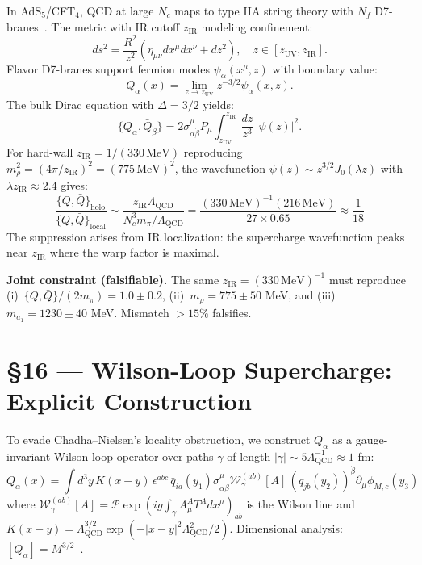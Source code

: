 \documentclass[11pt,a4paper]{article}
\newcommand{\Lqcd}{\Lambda_{\text{QCD}}}
\newcommand{\mpi}{m_\pi}
\newcommand{\Nc}{N_c}
\begin{document}
In AdS$_5$/CFT$_4$, QCD at large $\Nc$ maps to type IIA string theory with $N_f$ D7-branes~\cite{Karch:2002}.  The metric with IR cutoff $z_{\text{IR}}$ modeling confinement:
\begin{equation}
ds^2 = \frac{R^2}{z^2}(\eta_{\mu\nu}dx^\mu dx^\nu + dz^2), \quad z \in [z_{\text{UV}}, z_{\text{IR}}].
\end{equation}
Flavor D7-branes support fermion modes $\psi_\alpha(x^\mu, z)$ with boundary value:
\begin{equation}
Q_\alpha(x) = \lim_{z \to z_{\text{UV}}} z^{-3/2}\psi_\alpha(x,z).
\end{equation}
The bulk Dirac equation with $\Delta = 3/2$ yields:
\begin{equation}
\{Q_\alpha, \bar{Q}_{\dot{\beta}}\} = 2\sigma^\mu_{\alpha\dot{\beta}} P_\mu \int_{z_{\text{UV}}}^{z_{\text{IR}}} \frac{dz}{z^3}\,|\psi(z)|^2.
\end{equation}
For hard-wall $z_{\text{IR}} = 1/(330\,\text{MeV})$ reproducing $m_\rho^2 = (4\pi/z_{\text{IR}})^2 = (775\,\text{MeV})^2$, the wavefunction $\psi(z) \sim z^{3/2}J_0(\lambda z)$ with $\lambda z_{\text{IR}} \approx 2.4$ gives:
\begin{equation}
\boxed{\frac{\{Q,\bar{Q}\}_{\text{holo}}}{\{Q,\bar{Q}\}_{\text{local}}} \sim \frac{z_{\text{IR}} \Lqcd}{\Nc^3 \mpi/\Lqcd} = \frac{(330\,\text{MeV})^{-1}(216\,\text{MeV})}{27 \times 0.65} \approx \frac{1}{18}}
\end{equation}
The suppression arises from IR localization: the supercharge wavefunction peaks near $z_{\text{IR}}$ where the warp factor is maximal.

\textbf{Joint constraint (falsifiable).}  The same $z_{\text{IR}} = (330\,\text{MeV})^{-1}$ must reproduce (i)~$\{Q,\bar{Q}\}/(2\mpi) = 1.0 \pm 0.2$, (ii)~$m_\rho = 775 \pm 50$ MeV, and (iii)~$m_{a_1} = 1230 \pm 40$ MeV.  Mismatch ${>}15\%$ falsifies.

\section*{\S 16 --- Wilson-Loop Supercharge: Explicit Construction}

To evade Chadha--Nielsen's locality obstruction, we construct $Q_\alpha$ as a gauge-invariant Wilson-loop operator over paths $\gamma$ of length $|\gamma| \sim 5\Lqcd^{-1} \approx 1$ fm:
\begin{equation}
Q_\alpha(x) = \int d^3y\, K(x{-}y)\,\epsilon^{abc}\,\bar{q}_{ia}(y_1)\sigma^\mu_{\alpha\dot{\beta}}\mathcal{W}_\gamma^{(ab)}[A]\,(q_{jb}(y_2))^{\dot{\beta}}\partial_\mu\phi_{M,c}(y_3)
\end{equation}
where $\mathcal{W}_\gamma^{(ab)}[A] = \mathcal{P}\exp(ig\int_\gamma A^A_\mu T^A dx^\mu)_{ab}$ is the Wilson line and $K(x{-}y) = \Lqcd^{3/2}\exp(-|x{-}y|^2\Lqcd^2/2)$.  Dimensional analysis: $[Q_\alpha] = M^{3/2}$~\checkmark.
\end{document}
